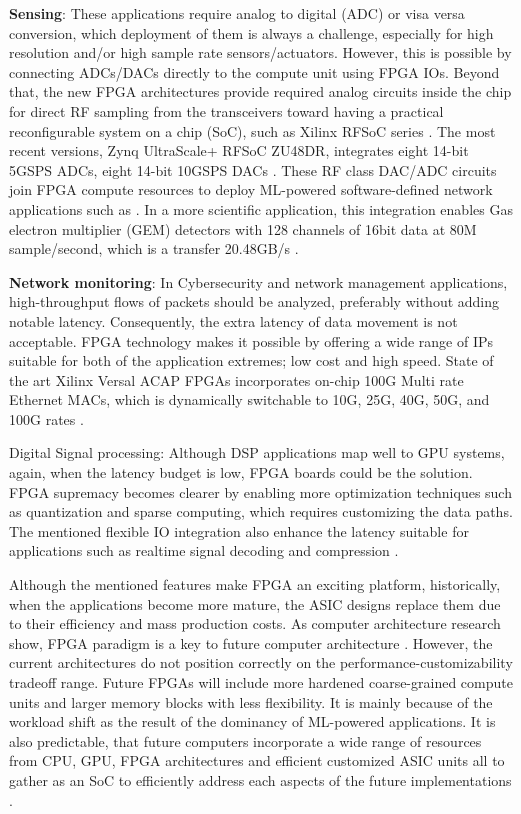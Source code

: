 {\bf Sensing}: These applications require analog to digital (ADC) or visa versa conversion, which deployment of them is always a challenge, especially for high resolution and/or high sample rate sensors/actuators. However, this is possible by connecting ADCs/DACs directly to the compute unit using FPGA IOs. Beyond that, the new FPGA architectures provide required analog circuits inside the chip for direct RF sampling from the transceivers toward having a practical reconfigurable system on a chip (SoC), such as Xilinx RFSoC series \cite{DBLP:conf/isscc/VazLVLMBMKTMBEF17,WP_Xilinx_RF}. The most recent versions, Zynq UltraScale+ RFSoC ZU48DR, integrates eight 14-bit 5GSPS ADCs, eight 14-bit 10GSPS DACs \cite{WP_Xilinx_ZCU208}. These RF class DAC/ADC circuits join FPGA compute resources to deploy ML-powered software-defined network applications such as \cite{DBLP:conf/ipps/TridgellBLKK020}. In a more scientific application, this integration enables Gas electron multiplier (GEM) detectors with 128 channels of 16bit data at 80M sample/second, which is a transfer 20.48GB/s \cite{GEMDetectors}. 

{\bf Network monitoring}: In Cybersecurity and network management applications, high-throughput flows of packets should be analyzed, preferably without adding notable latency. Consequently, the extra latency of data movement is not acceptable. FPGA technology makes it possible by offering a wide range of IPs suitable for both of the application extremes; low cost and high speed. State of the art Xilinx Versal ACAP FPGAs incorporates on-chip 100G Multi rate Ethernet MACs, which is dynamically switchable to 10G, 25G, 40G, 50G, and 100G rates \cite{DBLP:conf/fpga/GaideGRB19}.

Digital Signal processing: Although DSP applications map well to GPU systems, again, when the latency budget is low, FPGA boards could be the solution. FPGA supremacy becomes clearer by enabling more optimization techniques such as quantization and sparse computing, which requires customizing the data paths. The mentioned flexible IO integration also enhance the latency suitable for applications such as realtime signal decoding and compression \cite{WP_Xilinx_decoder}. 

Although the mentioned features make FPGA an exciting platform, historically, when the applications become more mature, the ASIC designs replace them due to their efficiency and mass production costs. As computer architecture research show, FPGA paradigm is a key to future computer architecture \cite{10.1145/3411757.3411759}. However, the current architectures do not position correctly on the performance-customizability tradeoff range. Future FPGAs will include more hardened coarse-grained compute units and larger memory blocks with less flexibility. It is mainly because of the workload shift as the result of the dominancy of ML-powered applications. It is also predictable, that future computers incorporate a wide range of resources from CPU, GPU, FPGA architectures and efficient customized ASIC units all to gather as an SoC to efficiently address each aspects of the future implementations \cite{10.1145/3411757.3411759}. 

